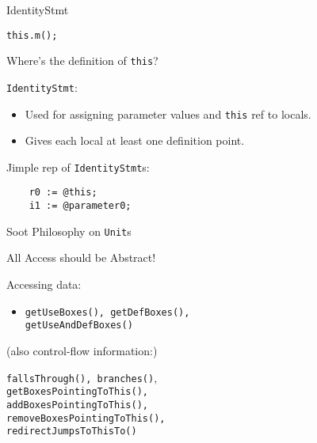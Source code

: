 \begin{slide}{IdentityStmt}
\begin{center}
{\tt this.m(); }
\end{center}

Where's the definition of {\tt this}?

\quad
\vspace*{-0.08in}

{\tt IdentityStmt}:
\begin{itemize}
\item Used for assigning parameter values and {\tt this} ref to locals.

\item Gives each local at least one definition point.
\end{itemize}

\vspace*{0.03in}
Jimple rep of {\tt IdentityStmt}s:
\begin{verbatim}
    r0 := @this;
    i1 := @parameter0;
\end{verbatim}
\end{slide}

\begin{slide}{Soot Philosophy on {\tt Unit}s}
\vspace*{-0.1in}
\begin{center}
All Access should be Abstract!
\end{center}

\vspace*{0.05in}
Accessing data:
\begin{itemize}
\item {\tt \yellow getUseBoxes(), getDefBoxes(),\\
\qquad \qquad  getUseAndDefBoxes()}
\end{itemize}

{\small 
(also control-flow information:)\\
\qquad \begin{minipage}{0.8\textwidth}
{\tt fallsThrough(), branches()},\\
{\tt getBoxesPointingToThis(), \\
 addBoxesPointingToThis(), \\
 removeBoxesPointingToThis(),}\\
{\tt redirectJumpsToThisTo()}
\end{minipage}}
\end{slide}

